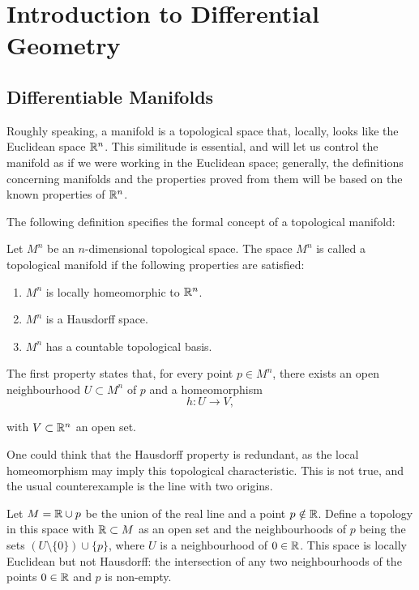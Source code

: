 \chapter{Introduction to Differential Geometry}
\label{chapter:diffgeom}

\section{Differentiable Manifolds}

Roughly speaking, a manifold is a topological space that, locally, looks like the Euclidean space $\mathbb{R}^n$. This similitude is essential, and will let us control the manifold as if we were working in the Euclidean space; generally, the definitions concerning manifolds and the properties proved from them will be based on the known properties of $\mathbb{R}^n$.

The following definition specifies the formal concept of a topological manifold:

\begin{definition}
    Let $M^n$ be an $n$-dimensional topological space. The space $M^n$ is called a topological manifold if the following properties are satisfied:
    \begin{enumerate}
        \item $M^n$ is locally homeomorphic to $\mathbb{R}^n$. \label{def:manifold:homeo}
        \item $M^n$ is a Hausdorff space. \label{def:manifold:haussdorf}
        \item $M^n$ has a countable topological basis. \label{def:manifold:basis}
    \end{enumerate}
\end{definition}

The first property states that, for every point $p \in M^n$, there exists an open neighbourhood $U \subset M^n$ of $p$ and a homeomorphism
\[
    h \colon U \to V,
\]

with $V \subset \mathbb{R}^n$ an open set.

One could think that the Hausdorff property is redundant, as the local homeomorphism may imply this topological characteristic. This is not true, and the usual counterexample is the line with two origins.

Let $M = \mathbb{R} \cup p$ be the union of the real line and a point $p \notin \mathbb{R}$. Define a topology in this space with $\mathbb{R} \subset M$ as an open set and the neighbourhoods of $p$ being the sets $(U \setminus \{0\}) \cup \{p\}$, where $U$ is a neighbourhood of $0 \in \mathbb{R}$. This space is locally Euclidean but not Hausdorff: the intersection of any two neighbourhoods of the points $0 \in \mathbb{R}$ and $p$ is non-empty.


